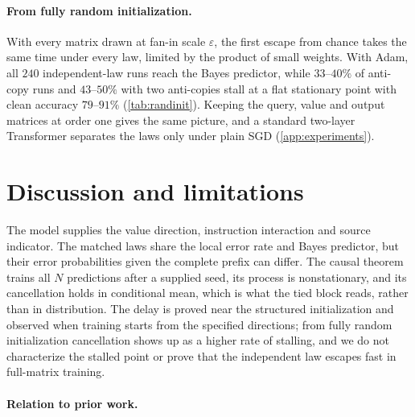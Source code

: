 \paragraph{From fully random initialization.} With every matrix drawn at fan-in scale $\varepsilon$, the first escape from chance takes the same time under
every law, limited by the product of small weights. With Adam, all
$240$ independent-law runs reach the Bayes predictor, while $33$--$40\%$ of anti-copy runs and $43$--$50\%$ with two anti-copies stall at a flat stationary point
with clean accuracy $79$--$91\%$ (\cref{tab:randinit}). Keeping the query, value and output matrices at order one gives the same picture, and a standard two-layer
Transformer separates the laws only under plain SGD (\cref{app:experiments}).

\section{Discussion and limitations}
\label{sec:scope}
The model supplies the value direction, instruction interaction and source indicator. The matched laws share the local error rate and Bayes predictor, but their error probabilities given the complete prefix can differ.
The causal theorem trains all $N$ predictions after a supplied seed, its process is nonstationary, and its cancellation holds in conditional mean,
which is what the tied block reads, rather than in distribution.
The delay is proved near the structured initialization and observed when training starts from the specified directions; from fully random initialization
cancellation shows up as a higher rate of stalling, and we do not characterize the stalled point or prove that the independent law escapes fast in full-matrix training.

\paragraph{Relation to prior work.}
\label{sec:related}


